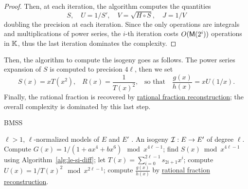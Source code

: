 \begin{proof}
  Then, at each iteration, the algorithm computes the quantities
  \begin{equation}
    \label{eq:174}
    S,\quad U = 1/S',\quad V = \sqrt{H\circ S},\quad J = 1/V
  \end{equation}
  doubling the precision at each iteration. Since the only operations
  are integrals and multiplications of power series, the $i$-th
  iteration costs $O(\mathsf{M}(2^i))$ operations in $\mathbb{K}$, thus the last
  iteration dominates the complexity.
\end{proof}


Then, the algorithm to compute the isogeny goes as follows.  The power
series expansion of $S$ is computed to precision $4\ell$, then we set
\begin{equation}
  \label{eq:180}
  S(x) = xT(x^2)
  \text{,}\quad
  R(x) = \frac{1}{T(x)^2}
  \text{,}\quad\text{so that}\quad
  \frac{g(x)}{h(x)} = xU(1/x)
  \text{.}
\end{equation}
Finally, the rational fraction is recovered by
\hyperref[sec:eucl-algor-rati]{rational fraction reconstruction}; the
overall complexity is dominated by this last step.

\begin{algorithm}
  \caption{BMSS}
  \begin{algorithmic}[1]
    \REQUIRE $\ell>1$, $\ell$-normalized models of $E$ and $E'$ .
    \ENSURE An isogeny $\mathcal{I}:E\rightarrow E'$ of degree $\ell$.
    \STATE Compute $G(x) = 1/(1 + ax^4 + bx^6) \mod x^{4\ell-1}$;
    \STATE find $S(x)\bmod x^{4\ell-1}$ using Algorithm~\ref{alg:le-si-diff};
    \STATE let $T(x) = \sum_{i=0}^{2\ell-1}s_{2i+1}x^i$;
    \STATE compute $U(x) = 1/T(x)^2 \mod x^{2\ell-1}$;
    \STATE compute $\frac{g(x)}{h(x)}$ by \hyperref[sec:eucl-algor-rati]{rational fraction reconstruction}.
  \end{algorithmic}
\end{algorithm}

